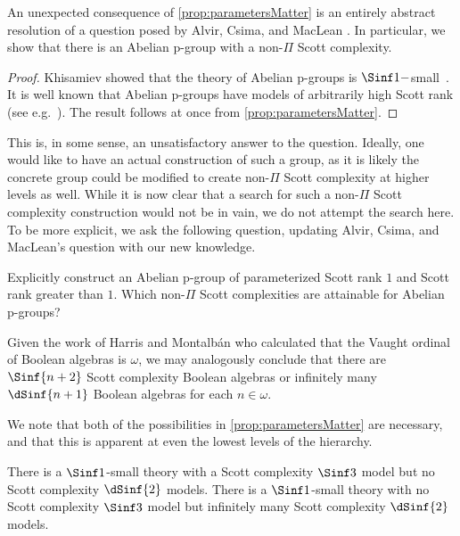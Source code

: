 \documentclass[10pt,a4paper]{amsart}
\renewcommand{\-}{\text{-}}
\begin{document}
An unexpected consequence of \cref{prop:parametersMatter} is an entirely abstract resolution of a question posed by Alvir, Csima, and MacLean \cite[Question 5.2]{ACM24}.
In particular, we show that there is an Abelian p-group with a non-$\Pi$ Scott complexity.

\abelianpsigma


\begin{proof}
Khisamiev showed that the theory of Abelian p-groups is $\Sinf1-$small~\cite{Khi04}.
It is well known that Abelian p-groups have models of arbitrarily high Scott rank (see e.g.~\cite{ACM24}).
The result follows at once from \cref{prop:parametersMatter}.
\end{proof}

This is, in some sense, an unsatisfactory answer to the question.
Ideally, one would like to have an actual construction of such a group, as it is likely the concrete group could be modified to create non-$\Pi$ Scott complexity at higher levels as well.
While it is now clear that a search for such a non-$\Pi$ Scott complexity construction would not be in vain, we do not attempt the search here.
To be more explicit, we ask the following question, updating Alvir, Csima, and MacLean's question with our new knowledge.

\begin{question}
  Explicitly construct an Abelian p-group of parameterized Scott rank $1$ and Scott rank greater than $1$. Which non-$\Pi$ Scott complexities are attainable for Abelian p-groups?
\end{question}

Given the work of Harris and Montalbán \cite{HM} who calculated that the Vaught ordinal of Boolean algebras is $\omega$, we may analogously conclude that there are $\Sinf{n+2}$ Scott complexity Boolean algebras or infinitely many $\dSinf{n+1}$ Boolean algebras for each $n\in\omega$.

We note that both of the possibilities in \cref{prop:parametersMatter} are necessary, and that this is apparent at even the lowest levels of the hierarchy.
\begin{proposition}
There is a $\Sinf1$-small theory with a Scott complexity $\Sinf3$ model but no Scott complexity $\dSinf{2}$ models.
There is a $\Sinf1$-small theory with no Scott complexity $\Sinf3$ model but infinitely many Scott complexity $\dSinf{2}$ models.
\end{proposition}
\end{document}
